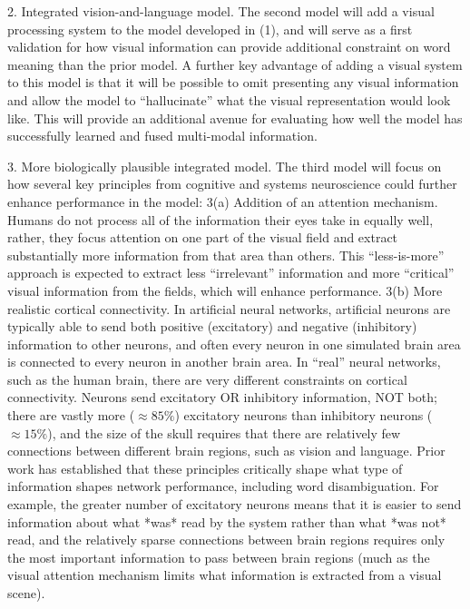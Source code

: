 \documentclass[letterpaper, 12pt]{article}
\begin{document}
2.  Integrated vision-and-language model.  The second model will add a visual processing system to the model developed in (1), and will serve as a first validation for how visual information can provide additional constraint on word meaning than the prior model.  A further key advantage of adding a visual system to this model is that it will be possible to omit presenting any visual information and allow the model to ``hallucinate'' what the visual representation would look like.  This will provide an additional avenue for evaluating how well the model has successfully learned and fused multi-modal information.     

3.  More biologically plausible integrated model.  The third model will focus on how several key principles from cognitive and systems neuroscience could further enhance performance in the model: 3(a) Addition of an attention mechanism. Humans do not process all of the information their eyes take in equally well, rather, they focus attention on one part of the visual field and extract substantially more information from that area than others.  This ``less-is-more'' approach is expected to extract less ``irrelevant'' information and more ``critical'' visual information from the fields, which will enhance performance.  3(b) More realistic cortical connectivity.  In artificial neural networks, artificial neurons are typically able to send both positive (excitatory) and negative (inhibitory) information to other neurons, and often every neuron in one simulated brain area is connected to every neuron in another brain area.  In ``real'' neural networks, such as the human brain, there are very different constraints on cortical connectivity.  Neurons send excitatory OR inhibitory information, NOT both; there are vastly more ($\approx85\%$) excitatory neurons than inhibitory neurons ($\approx15\%$), and the size of the skull requires that there are relatively few connections between different brain regions, such as vision and language. Prior work \citep{laszloPSPsERPsApplying2014, Armstrong2016Disparatesemanticambiguity} has established that these principles critically shape what type of information shapes network performance, including word disambiguation.  For example, the greater number of excitatory neurons means that it is easier to send information about what *was* read by the system rather than what *was not* read, and the relatively sparse connections between brain regions requires only the most important information to pass between brain regions (much as the visual attention mechanism limits what information is extracted from a visual scene).
\end{document}
